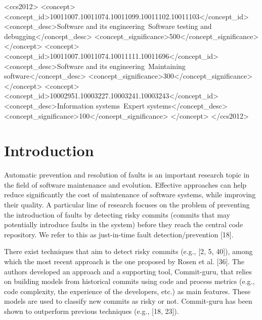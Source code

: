 \documentclass[sigconf]{acmart}
\begin{document}
%
%
\begin{CCSXML}
<ccs2012>
<concept>
<concept_id>10011007.10011074.10011099.10011102.10011103</concept_id>
<concept_desc>Software and its engineering~Software testing and debugging</concept_desc>
<concept_significance>500</concept_significance>
</concept>
<concept>
<concept_id>10011007.10011074.10011111.10011696</concept_id>
<concept_desc>Software and its engineering~Maintaining software</concept_desc>
<concept_significance>300</concept_significance>
</concept>
<concept>
<concept_id>10002951.10003227.10003241.10003243</concept_id>
<concept_desc>Information systems~Expert systems</concept_desc>
<concept_significance>100</concept_significance>
</concept>
</ccs2012>
\end{CCSXML}



\maketitle

\section{Introduction}\label{sec:introduction}

Automatic prevention and resolution of faults is an important research
topic in the field of software maintenance and evolution. Effective
approaches can help reduce significantly the cost of maintenance of
software systems, while improving their quality. A particular line of
research focuses on the problem of preventing the introduction of faults
by detecting risky commits (commits that may potentially introduce
faults in the system) before they reach the central code repository. We
refer to this as just-in-time fault detection/prevention [18].

There exist techniques that aim to detect risky commits (e.g., [2, 5,
40]), among which the most recent approach is the one proposed by
Rosen et al. [36]. The authors developed an approach and a
supporting tool, Commit-guru, that relies on building models from
historical commits using code and process metrics (e.g., code
complexity, the experience of the developers, etc.) as main features.
These models are used to classify new commits as risky or not.
Commit-guru has been shown to outperform previous techniques (e.g.,
[18, 23]).
\end{document}
